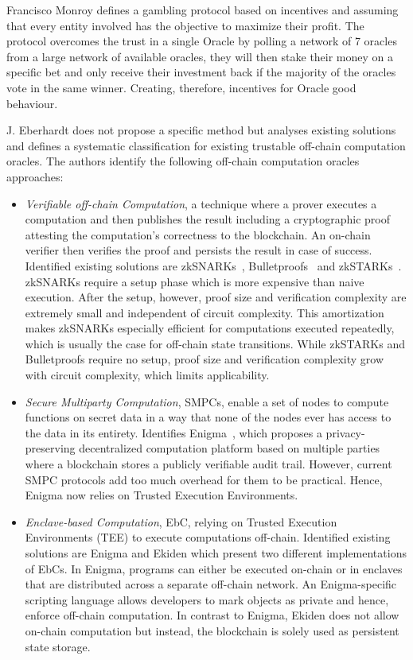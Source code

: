 \documentclass[final,3p,12pt,twocolumn]{elsarticle}
\begin{document}
Francisco Monroy \citet{MontotoMonroy2018} defines a gambling protocol based on incentives and assuming that every entity involved has the objective to maximize their profit. The protocol overcomes the trust in a single Oracle by polling a network of 7 oracles from a large network of available oracles, they will then stake their money on a specific bet and only receive their investment back if the majority of the oracles vote in the same winner. Creating, therefore, incentives for Oracle good behaviour.


J. Eberhardt \citet{Eberhardt2018} does not propose a specific method but analyses existing solutions and defines a systematic classification for existing trustable off-chain computation oracles. The authors identify the following off-chain computation oracles approaches:

\begin{itemize}
  \item \textit{Verifiable off-chain Computation}, a technique where a prover executes a computation and then publishes the result including a cryptographic proof attesting the computation’s correctness to the blockchain. An on-chain verifier then verifies the proof and persists the result in case of success. Identified existing solutions are zkSNARKs~\citet{Ben-SassonTechnionAlessandroChiesa2019}, Bulletproofs~\citet{Bunz2018} and zkSTARKs~\citet{Ben-Sasson2018}. zkSNARKs require a setup phase which is more expensive than naive execution. After the setup, however, proof size and verification complexity are extremely small and independent of circuit complexity. This amortization makes zkSNARKs especially efficient for computations executed repeatedly, which is usually the case for off-chain state transitions. While zkSTARKs and Bulletproofs require no setup, proof size and verification complexity grow with circuit complexity, which limits applicability.
  \item \textit{Secure Multiparty Computation}, SMPCs, enable a set of nodes to compute functions on secret data in a way that none of the nodes ever has access to the data in its entirety. Identifies Enigma~\citet{Tam2018}, which proposes a privacy-preserving decentralized computation platform based on multiple parties where a blockchain stores a publicly verifiable audit trail. However, current SMPC protocols add too much overhead for them to be practical. Hence, Enigma now relies on Trusted Execution Environments.
  \item \textit{Enclave-based Computation}, EbC, relying on Trusted Execution Environments (TEE) to execute computations off-chain. Identified existing solutions are Enigma and Ekiden \citet{Cheng2018} which present two different implementations of EbCs. In Enigma, programs can either be executed on-chain or in enclaves that are distributed across a separate off-chain network. An Enigma-specific scripting language allows developers to mark objects as private and hence, enforce off-chain computation. In contrast to Enigma, Ekiden does not allow on-chain computation but instead, the blockchain is solely used as persistent state storage.

\end{itemize}
\end{document}
